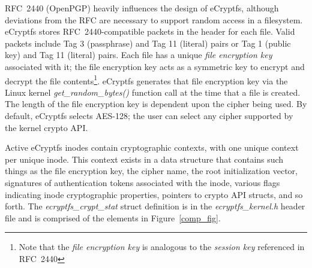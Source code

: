 \documentclass{article}
\begin{document}
RFC~2440 (OpenPGP) heavily influences the design of eCryptfs, although
deviations from the RFC are necessary to support random access in a
filesystem. eCryptfs stores RFC~2440-compatible packets in the header
for each file. Valid packets include Tag 3 (passphrase) and Tag 11
(literal) pairs or Tag 1 (public key) and Tag 11 (literal) pairs. Each
file has a unique \emph{file encryption key} associated with it; the
file encryption key acts as a symmetric key to encrypt and decrypt the
file contents\footnote{Note that the \emph{file encryption key} is
analogous to the \emph{session key} referenced in RFC~2440}. eCryptfs
generates that file encryption key via the Linux kernel
\emph{get\_random\_bytes()} function call at the time that a file is
created. The length of the file encryption key is dependent upon the
cipher being used. By default, eCryptfs selects AES-128; the user can
select any cipher supported by the kernel crypto API.

Active eCryptfs inodes contain cryptographic contexts, with one unique
context per unique inode. This context exists in a data structure that
contains such things as the file encryption key, the cipher name, the root
initialization vector, signatures of authentication tokens associated
with the inode, various flags indicating inode cryptographic
properties, pointers to crypto API structs, and so forth. The
\emph{ecryptfs\_crypt\_stat} struct definition is in the
\emph{ecryptfs\_kernel.h} header file and is comprised of the elements
in Figure~\ref{comp_fig}.
\end{document}
